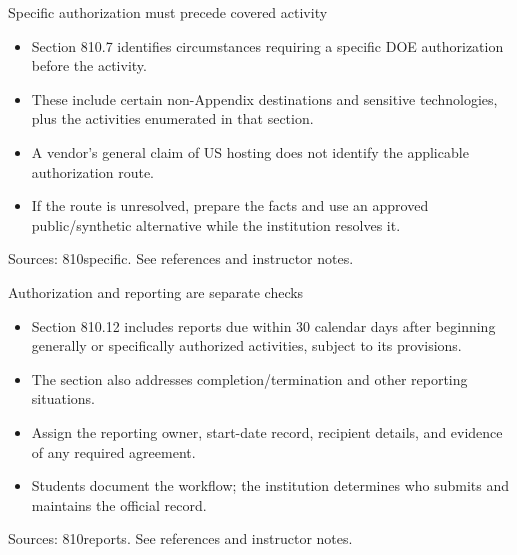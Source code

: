 \documentclass[aspectratio=169,11pt]{beamer}
\begin{document}
\begin{frame}[t,fragile]{Specific authorization must precede covered activity}
\fontsize{11.5}{14}\selectfont
\begin{itemize}\setlength{\itemsep}{2mm}
\item Section 810.7 identifies circumstances requiring a specific DOE authorization before the activity.
\item These include certain non-Appendix destinations and sensitive technologies, plus the activities enumerated in that section.
\item A vendor's general claim of US hosting does not identify the applicable authorization route.
\item If the route is unresolved, prepare the facts and use an approved public/synthetic alternative while the institution resolves it.
\end{itemize}
\vfill{\fontsize{6.5}{8}\selectfont\color{UTgray} Sources: 810specific. See references and instructor notes.\par}
\end{frame}
\begin{frame}[t,fragile]{Authorization and reporting are separate checks}
\fontsize{11.5}{14}\selectfont
\begin{itemize}\setlength{\itemsep}{2mm}
\item Section 810.12 includes reports due within 30 calendar days after beginning generally or specifically authorized activities, subject to its provisions.
\item The section also addresses completion/termination and other reporting situations.
\item Assign the reporting owner, start-date record, recipient details, and evidence of any required agreement.
\item Students document the workflow; the institution determines who submits and maintains the official record.
\end{itemize}
\vfill{\fontsize{6.5}{8}\selectfont\color{UTgray} Sources: 810reports. See references and instructor notes.\par}
\end{frame}
\end{document}
